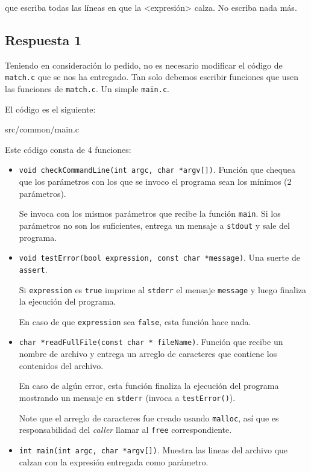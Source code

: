 \documentclass[spanish, fleqn]{article}
\begin{document}
que escriba todas las líneas en que la <expresión> calza. No escriba nada más.

\subsection{Respuesta 1}

Teniendo en consideración lo pedido, no es necesario modificar el código de \texttt{match.c} que se nos ha entregado. Tan solo debemos escribir funciones que usen las funciones de \texttt{match.c}. Un simple \texttt{main.c}.

El código es el siguiente:

 {src/common/main.c}
    
Este código consta de 4 funciones:
\begin{itemize}
    \item \texttt{void checkCommandLine(int argc, char *argv[])}. Función que chequea que los parámetros con los que se invoco el programa sean los mínimos (2 parámetros). 
    
    Se invoca con los mismos parámetros que recibe la función \texttt{main}. Si los parámetros no son los suficientes, entrega un mensaje a \texttt{stdout} y sale del programa.
    
    \item \texttt{void testError(bool expression, const char *message)}. Una suerte de \texttt{assert}. 
    
    Si \texttt{expression} es \texttt{true} imprime al \texttt{stderr} el mensaje \texttt{message} y luego finaliza la ejecución del programa. 
    
    En caso de que \texttt{expression} sea \texttt{false}, esta función hace nada.
    
    \item \texttt{char *readFullFile(const char * fileName)}. Función que recibe un nombre de archivo y entrega un arreglo de caracteres que contiene los contenidos del archivo. 
    
    En caso de algún error, esta función finaliza la ejecución del programa mostrando un mensaje en \texttt{stderr} (invoca a \texttt{testError()}). 
    
    Note que el arreglo de caracteres fue creado usando \texttt{malloc}, así que es responsabilidad del \textit{caller} llamar al \texttt{free} correspondiente.
    
    \item \texttt{int main(int argc, char *argv[])}. Muestra las lineas del archivo que calzan con la expresión entregada como parámetro.
\end{itemize}
\end{document}
